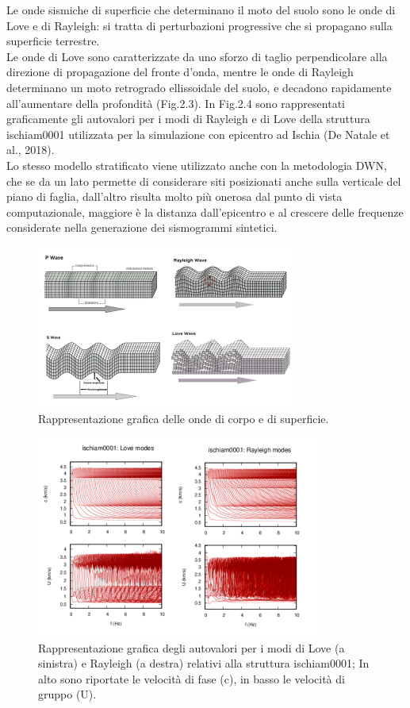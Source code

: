 \documentclass[a4paper,12pt,titlepage]{article}
\begin{document}
Le onde sismiche di superficie che determinano il moto del suolo sono le onde di Love e di Rayleigh: si tratta di perturbazioni progressive che si propagano sulla superficie terrestre.\\
Le onde di Love sono caratterizzate da uno sforzo di taglio perpendicolare alla direzione di propagazione del fronte d'onda, mentre le onde di Rayleigh determinano un moto retrogrado ellissoidale del suolo, e decadono rapidamente all'aumentare della profondità (Fig.2.3). In Fig.2.4 sono rappresentati graficamente gli autovalori per i modi di Rayleigh e di Love della struttura ischiam0001 utilizzata per la simulazione con epicentro ad Ischia (De Natale et al., 2018).\\
Lo stesso modello stratificato viene utilizzato anche con la metodologia DWN, che se da un lato permette di considerare siti posizionati anche sulla verticale del piano di faglia, dall'altro risulta molto più onerosa dal punto di vista computazionale, maggiore è la distanza dall'epicentro e al crescere delle frequenze considerate nella generazione dei sismogrammi sintetici.

\begin{figure}[htbp]
 \centering
 \includegraphics[width=.5\linewidth]{Img/PandSwaves.png}
 \caption{Rappresentazione grafica delle onde di corpo e di superficie.}
 \label{fig:PandSwaves}
\end{figure}

\begin{figure}[htbp]
 \centering
 \includegraphics[width=.5\linewidth]{Img/IscModes.png}
 \caption{Rappresentazione grafica degli autovalori per i modi di  Love (a sinistra) e Rayleigh (a
destra) relativi alla struttura ischiam0001; In alto sono
riportate le velocità di fase (c), in basso le velocità di gruppo (U).}
 \label{fig:IscModes}
\end{figure}
\end{document}
